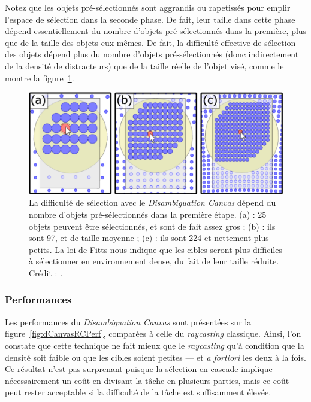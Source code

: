 	Notez que les objets pré-sélectionnés sont aggrandis ou rapetissés pour emplir l'espace de sélection dans la seconde phase. De fait, leur taille dans cette phase dépend essentiellement du nombre d'objets pré-sélectionnés dans la première, plus que de la taille des objets eux-mêmes. De fait, la difficulté effective de sélection des objets dépend plus du nombre d'objets pré-sélectionnés (donc indirectement de la densité de distracteurs) que de la taille réelle de l'objet visé, comme le montre la figure~\ref{fig:dCanvasDensity}.
	
	\begin{figure}[!htb]
		\centering
		\includegraphics[width=\textwidth]{figures/ch2/dCanvasDensity}
		\caption[\emph{Disambiguation Canvas} -- densité]{La difficulté de sélection avec le \emph{Disambiguation Canvas} dépend du nombre d'objets pré-sélectionnés dans la première étape. (a) : 25 objets peuvent être sélectionnés, et sont de fait assez gros ; (b) : ils sont 97, et de taille moyenne ; (c) : ils sont 224 et nettement plus petits. La loi de Fitts nous indique que les cibles seront plus difficiles à sélectionner en environnement dense, du fait de leur taille réduite. Crédit : \cite{debarba2013disambiguation}.}
		\label{fig:dCanvasDensity}
	\end{figure}
	
	\subsubsection{Performances}
	Les performances du \emph{Disambiguation Canvas} sont présentées sur la figure~\ref{fig:dCanvasRCPerf}, comparées à celle du \emph{raycasting} classique. Ainsi, l'on constate que cette technique ne fait mieux que le \emph{raycasting} qu'à condition que la densité soit faible ou que les cibles soient petites --- et \emph{a fortiori} les deux à la fois. Ce résultat n'est pas surprenant puisque la sélection en cascade implique nécessairement un coût en divisant la tâche en plusieurs parties, mais ce coût peut rester acceptable si la difficulté de la tâche est suffisamment élevée.
	
